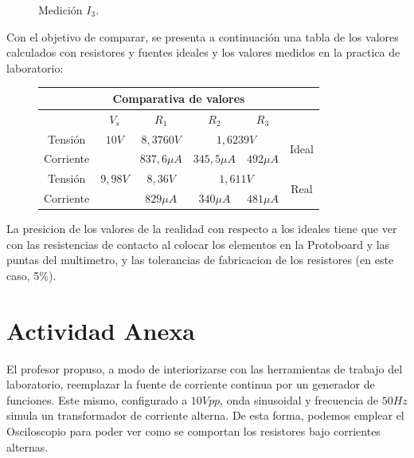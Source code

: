 \documentclass[a4paper,12pt, spanish]{report}
\newcommand\myemptypage{
  \newpage
  \null
  \thispagestyle{empty}
  \addtocounter{page}{-1}
  \newpage
}
\begin{document}
\begin{figure}[H]
\begin{minipage}{0.3\textwidth}
            \caption{Medición $I_3$.}
          \end{minipage}
      \end{figure}


      Con el objetivo de comparar, se presenta a continuación una tabla de los valores calculados con resistores y
      fuentes ideales y los valores medidos en la practica de laboratorio:
      \begin{figure}[!h]
        \centering
        \begin{tabular}[c]{|c||c|c|c|c||c|}
          \hline
          \multicolumn{6}{|c|}{Comparativa de valores}\\
          \hline
                    & $V_s$         & $R_1$         & $R_2$         & $R_3$         & \\
          \hline
          Tensión   & $10V$         & $8,3760V$     & \multicolumn{2}{|c||}{$1,6239V$} & \multirow{2}{*}{Ideal}\\
          \cline{1-5}
          Corriente &               & $837,6\mu A$  & $345,5\mu A$  & $492\mu A$    & \\
          \hline
          Tensión   & $9,98V$       & $8,36V$       & \multicolumn{2}{|c||}{$1,611V$}  & \multirow{2}{*}{Real}\\
          \cline{1-5}
          Corriente &               & $829\mu A$    & $340\mu A$    & $481\mu A$    & \\
          \hline
        \end{tabular}
      \end{figure}

      La presicion de los valores de la realidad con respecto a los ideales tiene que ver con las resistencias de
      contacto al colocar los elementos en la Protoboard y las puntas del multimetro, y las tolerancias de fabricacion
      de los resistores (en este caso, 5\%).

    \myemptypage
    \chapter{Actividad Anexa}
      El profesor propuso, a modo de interiorizarse con las herramientas de trabajo del laboratorio, reemplazar la
      fuente de corriente continua por un generador de funciones. Este mismo, configurado a $10Vpp$, onda sinusoidal y
      frecuencia de $50Hz$ simula un transformador de corriente alterna. De esta forma, podemos emplear el Osciloscopio
      para poder ver como se comportan los resistores bajo corrientes alternas.
\end{document}
